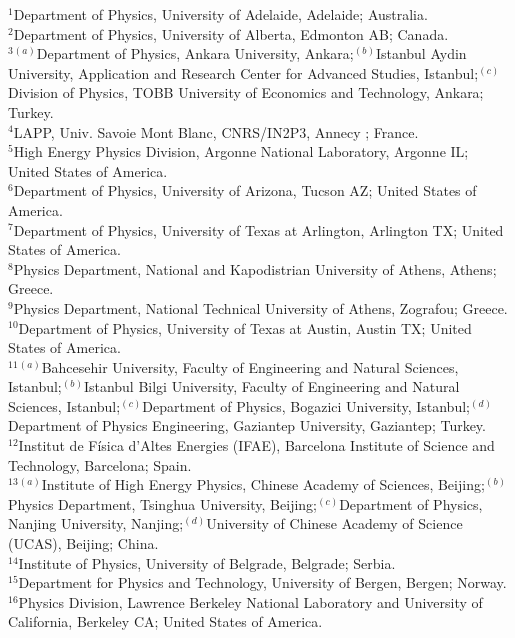\begin{flushleft}
$^{1}$Department of Physics, University of Adelaide, Adelaide; Australia.\\
$^{2}$Department of Physics, University of Alberta, Edmonton AB; Canada.\\
$^{3}$$^{(a)}$Department of Physics, Ankara University, Ankara;$^{(b)}$Istanbul Aydin University, Application and Research Center for Advanced Studies, Istanbul;$^{(c)}$Division of Physics, TOBB University of Economics and Technology, Ankara; Turkey.\\
$^{4}$LAPP, Univ. Savoie Mont Blanc, CNRS/IN2P3, Annecy ; France.\\
$^{5}$High Energy Physics Division, Argonne National Laboratory, Argonne IL; United States of America.\\
$^{6}$Department of Physics, University of Arizona, Tucson AZ; United States of America.\\
$^{7}$Department of Physics, University of Texas at Arlington, Arlington TX; United States of America.\\
$^{8}$Physics Department, National and Kapodistrian University of Athens, Athens; Greece.\\
$^{9}$Physics Department, National Technical University of Athens, Zografou; Greece.\\
$^{10}$Department of Physics, University of Texas at Austin, Austin TX; United States of America.\\
$^{11}$$^{(a)}$Bahcesehir University, Faculty of Engineering and Natural Sciences, Istanbul;$^{(b)}$Istanbul Bilgi University, Faculty of Engineering and Natural Sciences, Istanbul;$^{(c)}$Department of Physics, Bogazici University, Istanbul;$^{(d)}$Department of Physics Engineering, Gaziantep University, Gaziantep; Turkey.\\
$^{12}$Institut de F\'isica d'Altes Energies (IFAE), Barcelona Institute of Science and Technology, Barcelona; Spain.\\
$^{13}$$^{(a)}$Institute of High Energy Physics, Chinese Academy of Sciences, Beijing;$^{(b)}$Physics Department, Tsinghua University, Beijing;$^{(c)}$Department of Physics, Nanjing University, Nanjing;$^{(d)}$University of Chinese Academy of Science (UCAS), Beijing; China.\\
$^{14}$Institute of Physics, University of Belgrade, Belgrade; Serbia.\\
$^{15}$Department for Physics and Technology, University of Bergen, Bergen; Norway.\\
$^{16}$Physics Division, Lawrence Berkeley National Laboratory and University of California, Berkeley CA; United States of America.\\
$$
\end{flushleft}

